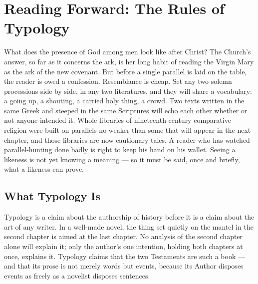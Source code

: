 \sectionguard
\section{Reading Forward: The Rules of Typology}

What does the presence of God among men look like after Christ? The
Church's answer, so far as it concerns the ark, is her long habit of
reading the Virgin Mary as the ark of the new covenant. But before a
single parallel is laid on the table, the reader is owed a confession.
Resemblance is cheap. Set any two solemn processions side by side, in any
two literatures, and they will share a vocabulary: a going up, a shouting,
a carried holy thing, a crowd. Two texts written in the same Greek and
steeped in the same Scriptures will echo each other whether or not anyone
intended it. Whole libraries of nineteenth-century comparative religion
were built on parallels no weaker than some that will appear in the next
chapter, and those libraries are now cautionary tales. A reader who has
watched parallel-hunting done badly is right to keep his hand on his
wallet. Seeing a likeness is not yet knowing a meaning --- so it must be
said, once and briefly, what a likeness can prove.

\subsection{What Typology Is}

Typology is a claim about the authorship of history before it is a claim
about the art of any writer. In a well-made novel, the thing set quietly
on the mantel in the second chapter is aimed at the last chapter. No
analysis of the second chapter alone will explain it; only the author's
one intention, holding both chapters at once, explains it. Typology claims
that the two Testaments are such a book --- and that its prose is not
merely words but events, because its Author disposes events as freely as a
novelist disposes sentences.

